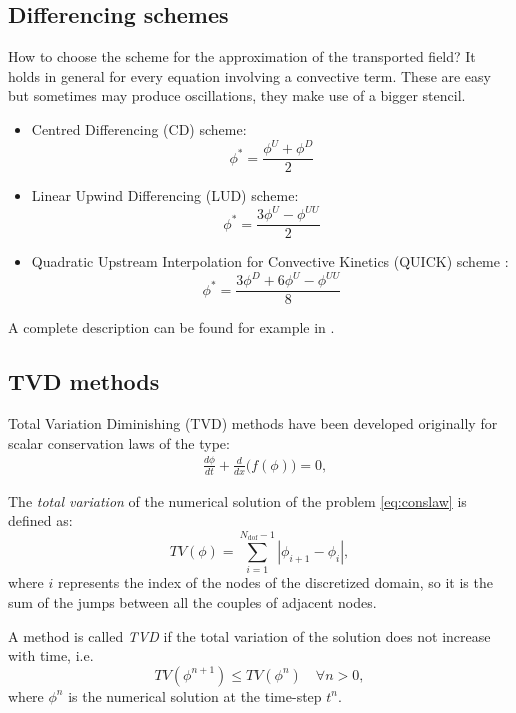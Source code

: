 \subsection{Differencing schemes} \label{subsec:diffscheme} %
How to choose the scheme for the approximation of the transported field?
It holds in general for every equation involving a convective term.
These are easy but sometimes may produce oscillations, they make use of a 
bigger stencil.
\begin{itemize}
\item Centred Differencing (CD) scheme:
\begin{equation} \label{eq:cd}
\phi^* = \frac{\phi^U + \phi^D}{2}
\end{equation}
\item Linear Upwind Differencing (LUD) scheme:
\begin{equation} \label{eq:lud}
\phi^* = \frac{3\phi^U - \phi^{UU}}{2}
\end{equation}
\item Quadratic Upstream Interpolation for Convective Kinetics (QUICK) scheme 
\cite{fv:leonard}:
\begin{equation} \label{eq:quick}
	\phi^* = \frac{3\phi^D + 6 \phi^U - \phi^{UU}}{8}
\end{equation}
\end{itemize}
A complete description can be found for example in \cite{main:vermal}.
\subsection{TVD methods} \label{subsec:tvd}
Total Variation Diminishing (TVD) methods have been developed originally for 
scalar conservation laws of the type:
\begin{align}
	\label{eq:conslaw} &\frac{d\phi}{dt} + \frac{d}{dx}\big(f(\phi)\big) = 0, 
\end{align}

\begin{defn}
	The \emph{total variation} of the numerical solution of the problem 
	\eqref{eq:conslaw} is defined as:
	\begin{equation}
		TV(\phi) = \sum_{i=1}^{N_\text{dof}-1} |\phi_{i+1} - \phi_i|,
	\end{equation}
	where $i$ represents the index of the nodes of the discretized domain, so 
	it is the sum of the jumps between all the couples of adjacent nodes.
\end{defn}
\begin{defn}
	A method is called \emph{TVD} if the total variation of the solution does 
	not increase with time, i.e. 
	\begin{equation}\label{eq:tvdcondition}
	TV(\phi ^{n+1}) \leq TV(\phi^n) \quad \forall n>0,
	\end{equation}
	where $\phi^n$ is the numerical solution at the time-step $t^n$.
\end{defn}

